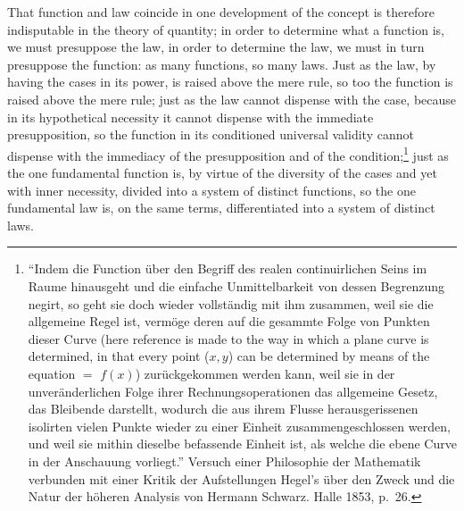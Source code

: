 \documentclass[12pt,a4paper,openany]{book}
\newcommand{\opage}[1]{\marginnote{\footnotesize\textit{[#1]}}}
\begin{document}
That function and law coincide in one development of the concept
is therefore indisputable in the theory of quantity; in order to
determine what a function is, we must presuppose the law,
in order to determine the law, we must in turn presuppose the function:
as many functions, so many laws. Just as the law, by
having the cases in its power, is raised above the mere
rule, so too the function is raised above the mere
rule; just as the law cannot dispense with the case, because in its hypothetical necessity
it cannot dispense with the immediate
presupposition, so the function in its conditioned
universal validity cannot dispense with the immediacy of the presupposition
and of the condition;\footnote[2]{``Indem die Function über den Begriff des realen continuirlichen Seins im Raume hinausgeht und die einfache Unmittelbarkeit von dessen Begrenzung negirt, so geht sie doch wieder vollständig mit ihm zusammen, weil sie die allgemeine Regel ist, vermöge deren auf die gesammte Folge von Punkten dieser Curve (here reference is made to the way in which a plane curve is determined, in that every point ($x, y$) can be determined by means of the equation $=$ $f(x)$) zurückgekommen werden kann, weil sie in der unveränderlichen Folge ihrer Rechnungsoperationen das allgemeine Gesetz, das Bleibende darstellt, wodurch die aus ihrem Flusse herausgerissenen isolirten vielen Punkte wieder zu einer Einheit zusammengeschlossen werden, und weil sie mithin dieselbe befassende Einheit ist, als welche die ebene Curve in der Anschauung vorliegt.'' Versuch einer Philosophie der Mathematik verbunden mit einer Kritik der Aufstellungen Hegel's über den Zweck und die Natur der höheren Analysis von Hermann Schwarz. Halle 1853, p.\ 26.} just as the one fundamental
\setcounter{footnote}{0}%
\opage{20}function is, by virtue of the diversity of the cases and yet with
inner necessity, divided into a system of distinct
functions, so the one fundamental law is, on the same
terms, differentiated into a system of distinct laws.%
\end{document}

